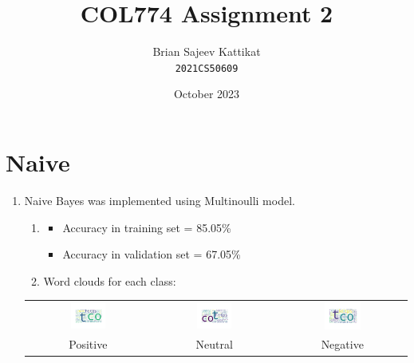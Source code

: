 \documentclass[12pt]{article}
\title{\textbf{COL774 Assignment 2}}
\author{Brian Sajeev Kattikat \\ \texttt{2021CS50609}}
\date{October 2023}
\begin{document}
\maketitle

\section{Naive }

\begin{enumerate}[label=(\alph*)]

    \item Naive Bayes was implemented using Multinoulli model.
          \begin{enumerate}[label=\roman*.]
              \item
                    \begin{itemize}
                        \item Accuracy in training set = 85.05\%                \item Accuracy in validation set = 67.05\%
                    \end{itemize}
              \item Word clouds for each class:
          \end{enumerate}
          \begin{center}
              \begin{tabular}{c c c}
                  \includegraphics[width=0.3\textwidth]{Images/Q1/a/ptext.png} & \includegraphics[width=0.3\textwidth]{Images/Q1/a/neutext.png} &
                  \includegraphics[width=0.3\textwidth]{Images/Q1/a/ntext.png}                                                                             \\
                  Positive                                                     & Neutral                                                        & Negative
              \end{tabular}
          \end{center}


\end{enumerate}
\end{document}
